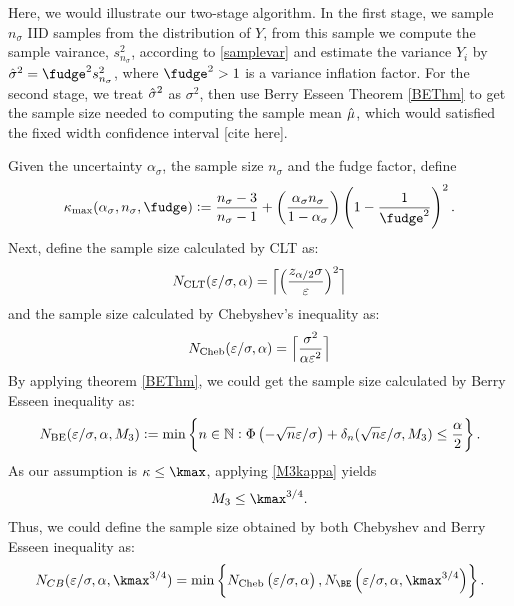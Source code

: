 \documentclass{iitthesis}
\begin{document}
\label{chapter:meanMCabsg}
Here, we would illustrate our two-stage algorithm. In the first stage, we sample $n_\sigma$ IID samples from the distribution of $Y$, from this sample we compute the sample vairance, $s_{n_\sigma}^2$, according to \eqref{samplevar} and estimate the variance $Y_i$ by $\hsigma^2 = \fudge^2s_{n_{\sigma}}^2$, where $\fudge^2>1$ is a variance inflation factor. For the second stage, we treat $\hat{\sigma}^2$ as $\sigma^2$, then use Berry Esseen Theorem \ref{BEThm} to get the sample size needed to computing the sample mean $\hat{\mu}$, which would satisfied the fixed width confidence interval [cite here].

Given the uncertainty $\alpha_{\sigma}$, the sample size $n_{\sigma}$ and the fudge factor, define
\begin{equation}
\label{kappamaxdef}
\kappa_{\max} (\alpha_\sigma, n_{\sigma},\fudge):= \frac{n_{\sigma}-3}{n_{\sigma}-1} + \left(\frac{ \alpha_\sigma n_{\sigma}}{1-\alpha_\sigma}\right) \left(1 - \frac{1}{\fudge^2}\right)^2.
\end{equation}
Next, define the sample size calculated by CLT as:
\begin{equation}\label{NCLT}
N_{\mathrm{CLT}}(\varepsilon/\sigma,\alpha)
= 
\Bigl\lceil
\Bigl(
\frac{z_{\alpha/2}\sigma}{\varepsilon}
\Bigr)^2
\Bigr\rceil
\end{equation}
and the sample size calculated by Chebyshev's inequality as:
\begin{equation}\label{NCheby}
N_{\text{Cheb}}(\varepsilon/\sigma,\alpha)
= 
\Bigl\lceil\frac{\sigma^2}{\alpha\varepsilon^2}\Bigr\rceil
\end{equation}
By applying theorem \ref{BEThm}, we could get the sample size calculated by Berry Esseen inequality as:
\begin{equation}\label{NBE}
N_{\text{BE}}(\varepsilon/\sigma,\alpha,M_3) := \min \left \{ n \in \mathbb{N} : \Phi\left(-\sqrt{n}\varepsilon/\sigma  \right)+\delta_n(\sqrt{n}\varepsilon/\sigma,M_3)
\le \frac{\alpha}{2} \right \}.
\end{equation}
As our assumption is $\kappa \leq \kmax$, applying \eqref{M3kappa} yields 
\begin{align}\label{M3kmax}
M_3 \leq \kmax^{3/4}.
\end{align}
Thus, we could define the sample size obtained by both Chebyshev and Berry Esseen inequality as:
\begin{align}\label{NCB}
N_{CB} (\varepsilon/\sigma,\alpha, \kmax^{3/4})  = \min \left \{ N_{\Cheb}\left(\varepsilon/\sigma,\alpha\right),N_{\BE}\left(\varepsilon/\sigma,\alpha, \kmax^{3/4}\right)\right \}.
\end{align}
\end{document}
